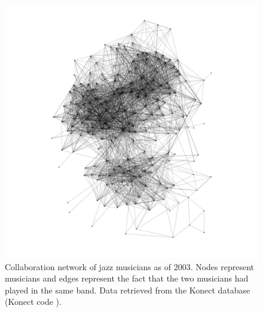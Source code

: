 \documentclass[
11pt, %
english, %
singlespacing, %
nolistspacing, %
liststotoc, %
headsepline, %
]{MastersDoctoralThesis} %
\begin{document}
\begin{figure}
	\includegraphics[width=\textwidth]{network-arenas-jazz.pdf}
	\caption{Collaboration network of jazz musicians as of 2003. Nodes represent musicians and edges represent the fact that the two musicians had played in the same band. Data retrieved from the Konect database \cite{kunegis2013konect} (Konect code ).}
	\label{Figure: Network of jazz musicians collaborations}
\end{figure}
\end{document}
